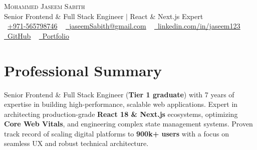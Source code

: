 \documentclass[letterpaper,12pt]{article}
\begin{document}
\begin{center}
    {\Huge \scshape Mohammed Jaseem Sabith} \\ \vspace{2pt}
    \large Senior Frontend \& Full Stack Engineer $|$ React \& Next.js Expert \\ \vspace{2pt}
    \small \raisebox{-0.1\height}\faPhone\ \href{tel:+971565798746}{+971-565798746} ~ \href{mailto:jaseemSabith@gmail.com}{\raisebox{-0.2\height}\faEnvelope\  \underline{jaseemSabith@gmail.com}} ~ 
    \href{https://www.linkedin.com/in/jaseem123/}{\raisebox{-0.2\height}\faLinkedin\ \underline{linkedin.com/in/jaseem123}} \\ \vspace{0pt}
    \href{https://github.com/Jaseem8}{\raisebox{-0.2\height}\faGithub\ \underline{GitHub}} ~
    \href{https://jaseem8.github.io/}{\raisebox{-0.2\height}\faGlobe\ \underline{Portfolio}}
    \vspace{-4pt}
\end{center}

\section{Professional Summary}
\vspace{-2pt}
\small{
    Senior Frontend \& Full Stack Engineer (\textbf{Tier 1 graduate}) with 7 years of expertise in building high-performance, scalable web applications. Expert in architecting production-grade \textbf{React 18 \& Next.js} ecosystems, optimizing \textbf{Core Web Vitals}, and engineering complex state management systems. Proven track record of scaling digital platforms to \textbf{900k+ users} with a focus on seamless UX and robust technical architecture.
}
\vspace{-6pt}

\end{document}
